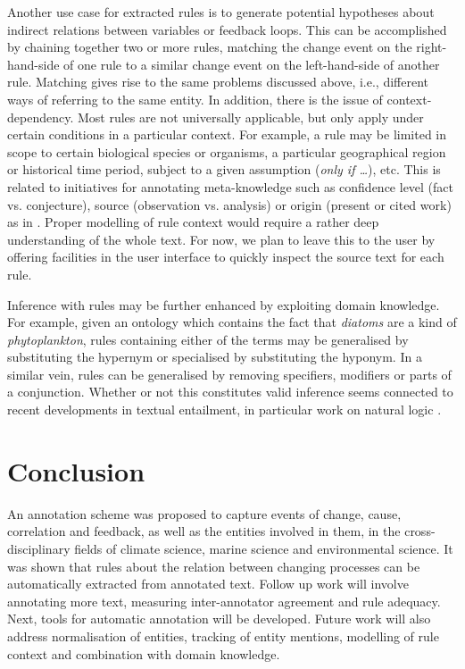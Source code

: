 \documentclass[10pt, a4paper]{article}
\begin{document}
Another use case for extracted rules is to generate potential hypotheses about indirect relations between variables or feedback loops.
This can be accomplished by chaining together two or more rules, matching the change event on the right-hand-side of one rule to a similar change event on the left-hand-side of another rule.
Matching gives rise to the same problems discussed above, i.e., different ways of referring to the same entity.
In addition, there is the issue of context-dependency.
Most rules are not universally applicable, but only apply under certain conditions in a particular context.
For example, a rule may be limited in scope to certain biological species or organisms, a particular geographical region or historical time period, subject to a given assumption (\emph{only if \ldots}), etc.
This is related to initiatives for annotating meta-knowledge such as confidence level (fact vs. conjecture), source (observation vs. analysis) or origin (present or cited work) as in  \cite{Thompson2011Enriching}.  
Proper modelling of rule context would require a rather deep understanding of the whole text. 
For now, we plan to leave this to the user by offering facilities in the user interface to quickly inspect the source text for each rule.

Inference with rules may be further enhanced by exploiting domain knowledge.
For example, given an ontology which contains the fact that \emph{diatoms} are a kind of \emph{phytoplankton}, rules containing either of the terms may be generalised by substituting the hypernym or specialised by substituting the hyponym.
In a similar vein, rules can be generalised by removing specifiers, modifiers or parts of a conjunction.
Whether or not this constitutes valid inference seems connected to recent developments in textual entailment, in particular work on natural logic \cite{MacCartney2008Modeling}.
    

\section{Conclusion}
\label{sec:conclusion}

An annotation scheme was proposed to capture events of change, cause, correlation and feedback, as well as  the entities involved in them, in the cross-disciplinary fields of climate science, marine science and environmental science.
It was shown that rules about the relation between changing processes can be automatically extracted from annotated text.
Follow up work will involve annotating more text, measuring inter-annotator agreement and rule adequacy.
Next, tools for automatic annotation will be developed.
Future work will also address normalisation of entities, tracking of entity mentions, modelling of rule context and combination with domain knowledge. 
\end{document}
